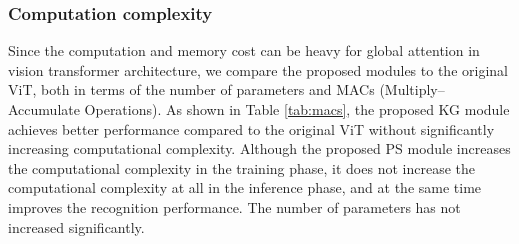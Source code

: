 \documentclass[5p,twocolumn]{elsarticle}
\begin{document}
\subsubsection{\textbf{Computation complexity}}
Since the computation and memory cost can be heavy for global attention in vision transformer architecture, we compare the proposed modules to the original ViT, both in terms of the number of parameters and MACs (Multiply–Accumulate Operations). As shown in Table \ref{tab:macs}, the proposed KG module achieves better performance compared to the original ViT without significantly increasing computational complexity. Although the proposed PS module increases the computational complexity in the training phase, it does not increase the computational complexity at all in the inference phase, and at the same time improves the recognition performance. The number of parameters has not increased significantly.
\end{document}
